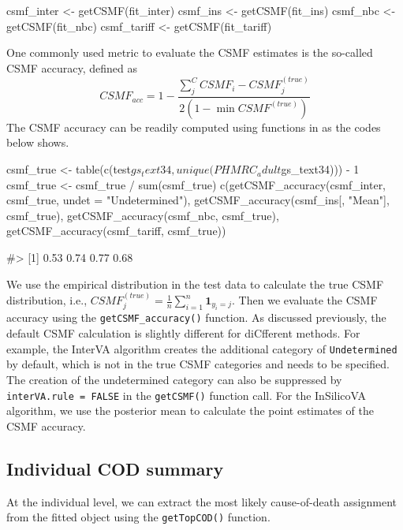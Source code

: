 \begin{Schunk}
\begin{Sinput}
csmf_inter <- getCSMF(fit_inter)
csmf_ins <- getCSMF(fit_ins)
csmf_nbc <- getCSMF(fit_nbc)
csmf_tariff <- getCSMF(fit_tariff)
\end{Sinput}
\end{Schunk}

One commonly used metric to evaluate the CSMF estimates is the so-called
CSMF accuracy, defined as \[
CSMF_{acc} = 1 - \frac{\sum_j^C CSMF_i - CSMF_j^{(true)}}{2(1 - \min CSMF^{(true)})}
\] The CSMF accuracy can be readily computed using functions in
 as the codes below shows.

\begin{Schunk}
\begin{Sinput}
csmf_true <- table(c(test$gs_text34, unique(PHMRC_adult$gs_text34))) - 1
csmf_true <- csmf_true / sum(csmf_true)
c(getCSMF_accuracy(csmf_inter, csmf_true, undet = "Undetermined"), 
  getCSMF_accuracy(csmf_ins[, "Mean"], csmf_true), 
  getCSMF_accuracy(csmf_nbc, csmf_true), 
  getCSMF_accuracy(csmf_tariff, csmf_true))
\end{Sinput}
\begin{Soutput}
#> [1] 0.53 0.74 0.77 0.68
\end{Soutput}
\end{Schunk}

We use the empirical distribution in the test data to calculate the true
CSMF distribution, i.e.,
\(CSMF_j^{(true)} = \frac{1}{n}\sum_{i=1}^n \bm{1}_{y_i = j}\). Then we
evaluate the CSMF accuracy using the \texttt{getCSMF\_accuracy()}
function. As discussed previously, the default CSMF calculation is
slightly different for diCfferent methods. For example, the InterVA
algorithm creates the additional category of \texttt{Undetermined} by
default, which is not in the true CSMF categories and needs to be
specified. The creation of the undetermined category can also be
suppressed by \texttt{interVA.rule\ =\ FALSE} in the \texttt{getCSMF()}
function call. For the InSilicoVA algorithm, we use the posterior mean
to calculate the point estimates of the CSMF accuracy.

\hypertarget{individual-cod-summary}{%
\subsection{Individual COD summary}\label{individual-cod-summary}}

At the individual level, we can extract the most likely cause-of-death
assignment from the fitted object using the \texttt{getTopCOD()}
function.

